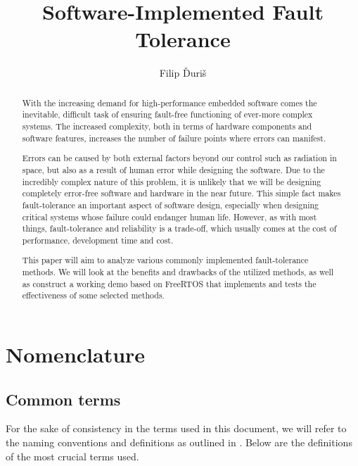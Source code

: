 \documentclass[12pt, letterpaper]{article}
\title{\Huge \textbf{Software-Implemented Fault Tolerance}}
\author{Filip Ďuriš}
\begin{document}
\maketitle

\newpage

\begin{abstract}
With the increasing demand for high-performance embedded software comes the inevitable, difficult task of ensuring fault-free functioning of ever-more complex systems. The increased complexity, both in terms of hardware components and software features, increases the number of failure points where errors can manifest.

Errors can be caused by both external factors beyond our control such as radiation in space, but also as a result of human error while designing the software. Due to the incredibly complex nature of this problem, it is unlikely that we will be designing completely error-free software and hardware in the near future. This simple fact makes fault-tolerance an important aspect of software design, especially when designing critical systems whose failure could endanger human life. However, as with most things, fault-tolerance and reliability is a trade-off, which usually comes at the cost of performance, development time and cost.

This paper will aim to analyze various commonly implemented fault-tolerance methods. We will look at the benefits and drawbacks of the utilized methods, as well as construct a working demo based on FreeRTOS that implements and tests the effectiveness of some selected methods.
\end{abstract}

\newpage

\tableofcontents

\newpage

\section{Nomenclature}

\subsection{Common terms}

For the sake of consistency in the terms used in this document, we will refer to the naming conventions and definitions as outlined in \cite{1335465}. Below are the definitions of the most crucial terms used. \\
\end{document}
